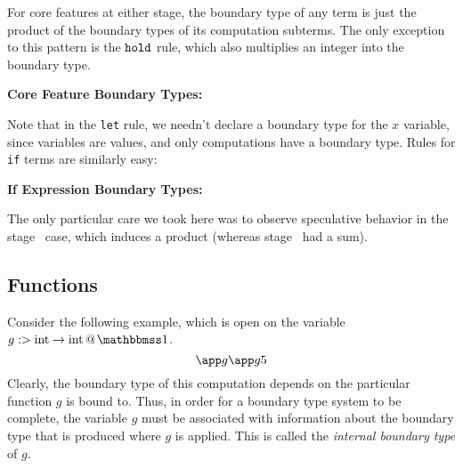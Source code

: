 \documentclass[]{article}
\newcommand {\next}{asdlfkj}
\begin{document}
\begin{abstrsyn}
For core features at either stage, the boundary type of any term is 
just the product of the boundary types of its computation subterms.
The only exception to this pattern is the ${\tt hold}$ rule,
which also multiplies an integer into the boundary type.

\begin{framed}
\noindent\textbf{Core Feature Boundary Types:}
\end{framed}

Note that in the {\tt let} rule, we needn't declare a boundary type for the $x$ variable,
since variables are values, and only computations have a boundary type.
Rules for \texttt{if} terms are similarly easy: 

\begin{framed}
\noindent\textbf{If Expression Boundary Types:}
\end{framed}

The only particular care we took here was to observe speculative behavior in the stage \bbtwo\ case,
which induces a product (whereas stage \bbone\ had a sum).

\subsection {Functions}

Consider the following example, which is open on the variable \mbox{$\colfun g {\rmint \to \rmint} \bbone$}.
\[
\app g {\app g 5}
\]
Clearly, the boundary type of this computation depends on the particular function $g$ is bound to.
Thus, in order for a boundary type system to be complete,
the variable $g$ must be associated with information about the boundary type that is produced where $g$ is applied.
This is called the \emph{internal boundary type} of $g$.


\end{abstrsyn}
\end{document}
